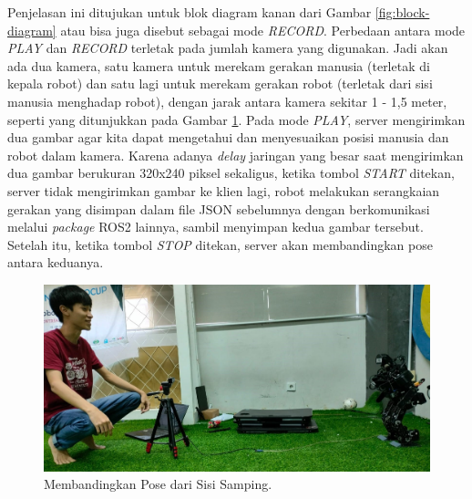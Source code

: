 Penjelasan ini ditujukan untuk blok diagram kanan dari Gambar \ref{fig:block-diagram} atau bisa juga disebut sebagai mode \textit{RECORD}. Perbedaan antara mode \textit{PLAY} dan \textit{RECORD} terletak pada jumlah kamera yang digunakan.
Jadi akan ada dua kamera, satu kamera untuk merekam gerakan manusia (terletak di kepala robot) dan satu lagi untuk merekam gerakan robot (terletak dari sisi manusia menghadap robot), dengan jarak antara kamera sekitar 1 - 1,5 meter, seperti yang ditunjukkan pada Gambar \ref{fig:pose-comparison-side}.
Pada mode \textit{PLAY}, server mengirimkan dua gambar agar kita dapat mengetahui dan menyesuaikan posisi manusia dan robot dalam kamera. Karena adanya \textit{delay} jaringan yang besar saat mengirimkan dua gambar berukuran 320x240 piksel sekaligus, ketika tombol \textit{START} ditekan,
server tidak mengirimkan gambar ke klien lagi, robot melakukan serangkaian gerakan yang disimpan dalam file JSON sebelumnya dengan berkomunikasi melalui \textit{package} ROS2 lainnya, sambil menyimpan kedua gambar tersebut. Setelah itu, ketika tombol \textit{STOP} ditekan, server akan membandingkan pose antara keduanya.
\begin{figure}[ht]
  \centering
  \includegraphics[scale=0.3]{gambar/pose-comparison.jpeg}
  \caption{Membandingkan Pose dari Sisi Samping.}
  \label{fig:pose-comparison-side}
\end{figure}

